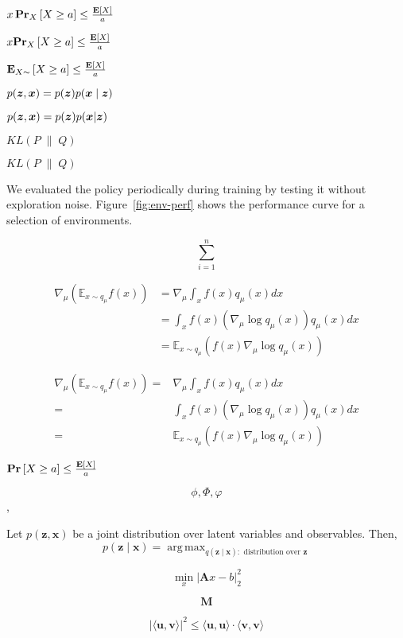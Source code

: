 \documentclass[11pt]{article}
\DeclareMathOperator*{\argmax}{arg\,max}
\begin{document}
$ x\operatorname*{\mathbf{Pr}}_{X} \left[ X \geq a \right] \leq \frac{\mathbf{E}[X]}{a}$

$ x\mathbf{Pr}_{X} \left[ X \geq a \right] \leq \frac{\mathbf{E}[X]}{a}$

$ \operatorname*{\mathbf{E}}_{X \sim} \left[ X \geq a \right] \leq \frac{\mathbf{E}[X]}{a}$


$p(\boldsymbol{z}, {\boldsymbol{x}}) = p(\boldsymbol{z}) p({\boldsymbol{x}} \mid \boldsymbol{z})$

$p(\boldsymbol{z}, {\boldsymbol{x}}) = p(\boldsymbol{z}) p({\boldsymbol{x}} | \boldsymbol{z})$

$KL \left( P \; \middle\| \; Q \right)$

$KL \left( P \; \middle\| \; Q \right)$


We evaluated the policy periodically during training by testing it without exploration noise.
Figure~\ref{fig:env-perf} shows the performance curve for a selection of environments.

$$\sum_{i=1}^n$$

\begin{align*}
    \nabla_{\mu} (\mathbb{E}_{x\sim q_{\mu}} f(x)) & = \nabla_{\mu} \int_x f(x) q_{\mu}(x) dx                                     \\
                                                   & =  \int_x f(x) (\nabla_{\mu} \log q_{\mu}(x))  q_{\mu}(x) dx                 \\
                                                   & = \mathbb{E}_{x \sim q_{\mu}} \left(f(x) \nabla_{\mu} \log q_{\mu}(x)\right)
\end{align*}

\begin{align*}
    \nabla_{\mu} (\mathbb{E}_{x\sim q_{\mu}} f(x))  = & \nabla_{\mu} \int_x f(x) q_{\mu}(x) dx                                     \\
    =                                                 & \int_x f(x) (\nabla_{\mu} \log q_{\mu}(x))  q_{\mu}(x) dx                  \\
    =                                                 & \mathbb{E}_{x \sim q_{\mu}} \left(f(x) \nabla_{\mu} \log q_{\mu}(x)\right)
\end{align*}

$ \operatorname*{\mathbf{Pr}} \left[ X \geq a \right] \leq \frac{\operatorname*{\mathbf{E}}[X]}{a}$

$$\phi, \Phi, \varphi$$ ,

\begin{theorem} \label{thm:gibbs}
    Let $p(\mathbf{z}, \mathbf{x})$ be a joint distribution over latent variables and observables. Then,
    $$p(\mathbf{z} \mid \mathbf{x}) = \argmax_{q(\mathbf{z} \mid \mathbf{x}) : \mbox{ distribution over } \mathbf{z}}$$
\end{theorem}

\renewcommand{\bA}{\boldsymbol{A}}
$$\min_x \lvert \bA x - b \rvert_2^2$$

$$\boldsymbol{M}$$

\newcommand{\dotprod}[2]{\langle #1, #2 \rangle}
\renewcommand{\bu}{\boldsymbol{u}}
\renewcommand{\bv}{\boldsymbol{v}}
$$\left\lvert \dotprod{\bu}{\bv} \right\rvert^2 \leq \dotprod{\bu}{\bu} \cdot \dotprod{\bv}{\bv}$$
\end{document}
